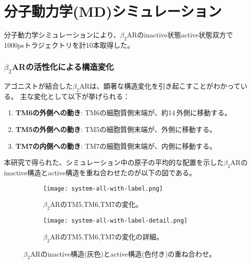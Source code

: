 \section{分子動力学(MD)シミュレーション}

分子動力学シミュレーションにより、$\beta_2$ARのinactive状態active状態双方で1000psトラジェクトリを計10本取得した。

\subsubsection{$\beta_2$ARの活性化による構造変化}
アゴニストが結合した$\beta_2$ARは、顕著な構造変化を引き起こす\cite{rasmussen2011crystal}\cite{poudel2021activation}ことがわかっている。
主な変化として以下が挙げられる：
\begin{enumerate}
    \item \textbf{TM6の外側への動き}: TM6の細胞質側末端が、約14\,\text{\AA}外側に移動する。
    \item \textbf{TM5の外側への動き}: TM5の細胞質側末端が、外側に移動する。
    \item \textbf{TM7の内側への動き}: TM7の細胞質側末端が、内側に移動する。
\end{enumerate}

本研究で得られた、シミュレーション中の原子の平均的な配置を示した$\beta_2$ARのinactive構造とactive構造を重ね合わせたのが以下の図である。
\begin{figure}[htbp]
  \centering
  \begin{subfigure}{0.88\textwidth} %
    \centering
    \texttt{[image: system-all-with-label.png]}
    \caption{$\beta_2$ARのTM5,TM6,TM7の変化。}
    \label{fig:fitting_TM}
  \end{subfigure}
  \hspace{0.02\textwidth} %
  \begin{subfigure}{0.88\textwidth}
    \centering
    \texttt{[image: system-all-with-label-detail.png]}
    \caption{$\beta_2$ARのTM5,TM6,TM7の変化の詳細。}
    \label{fig:fitting_TM_detail}
  \end{subfigure}
  \caption{$\beta_2$ARのinactive構造(灰色)とactive構造(色付き)の重ね合わせ。}
  \label{fig:fitting-all}
\end{figure}

